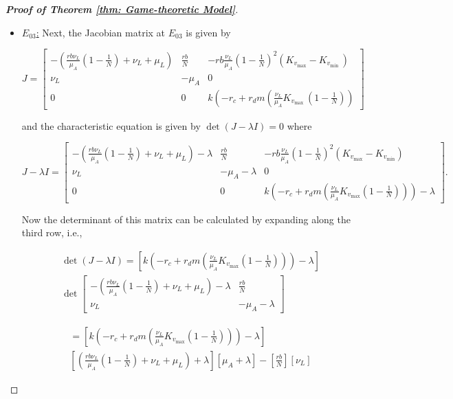 \documentclass{article}
\theoremstyle{remark}
\theoremstyle{custom} %
\begin{document}
\begin{proof}[\textbf{Proof of Theorem \ref{thm: Game-theoretic Model}}]
\begin{itemize}
 \item \underline{$E_{03}$:} Next, the Jacobian matrix at $E_{03}$ is given by

$$
J=\left[\begin{array}{ccc}
-\left(\frac{r b \nu_L}{\mu_A}\left(1-\frac{1}{{N}}\right)+\nu_L+\mu_L\right) & \frac{r b}{{N}} & -r b \frac{\nu_L}{\mu_A}\left(1-\frac{1}{{N}}\right)^2\left(K_{v_{\max }}-K_{v_{\text {min }}}\right) \\
\nu_L & -\mu_A & 0 \\
0 & 0 & k\left(-r_c+r_d m\left(\frac{\nu_L}{\mu_A} K_{v_{\text {max }}}\left(1-\frac{1}{{N}}\right)\right)\right.
\end{array}\right]
$$

and the characteristic equation is given by \(\det(J - \lambda I) = 0\) where

\[
J-\lambda I = \left[
\begin{array}{ccc}
-\left(\frac{r b \nu_L}{\mu_A}\left(1 - \frac{1}{{N}}\right) + \nu_L + \mu_L\right) - \lambda 
& \frac{r b}{{N}} 
& -r b \frac{\nu_L}{\mu_A}\left(1 - \frac{1}{{N}}\right)^2\left(K_{v_{\max}} - K_{v_{\min}}\right) \\
\nu_L 
& -\mu_A - \lambda 
& 0 \\
0 
& 0 
& k\left(-r_c + r_d  m \left(\frac{\nu_L}{\mu_A} K_{v_{\max}}\left(1 - \frac{1}{{N}}\right)\right)\right) - \lambda
\end{array}
\right].
\]

Now the determinant of this matrix can be calculated by expanding along the third row, i.e.,

$$
\begin{aligned}
& \operatorname{det}(J-\lambda I)=\left[k\left(-r_c+r_d m\left(\frac{\nu_L}{\mu_A} K_{v_{\max }}\left(1-\frac{1}{{N}}\right)\right)\right)-\lambda\right] \\
& \operatorname{det}\left[\begin{array}{cc}
-\left(\frac{r b \nu_L}{\mu_A}\left(1-\frac{1}{{N}}\right)+\nu_L+\mu_L\right)-\lambda & \frac{r b}{{N}} \\
\nu_L & -\mu_A-\lambda
\end{array}\right]
\end{aligned}
$$

$$
\begin{aligned}
&=\left[k\left(-r_c+r_d m\left(\frac{\nu_L}{\mu_A} K_{v_{\max }}\left(1-\frac{1}{{N}}\right)\right)\right)-\lambda\right]\\
& {\left[\left(\frac{r b \nu_L}{\mu_A}\left(1-\frac{1}{{N}}\right)+\nu_L+\mu_L\right)+\lambda\right]\left[\mu_A+\lambda\right]-\left[\frac{r b}{{N}}\right]\left[\nu_L\right] }
\end{aligned}
$$


\end{itemize}
\end{proof}
\end{document}
